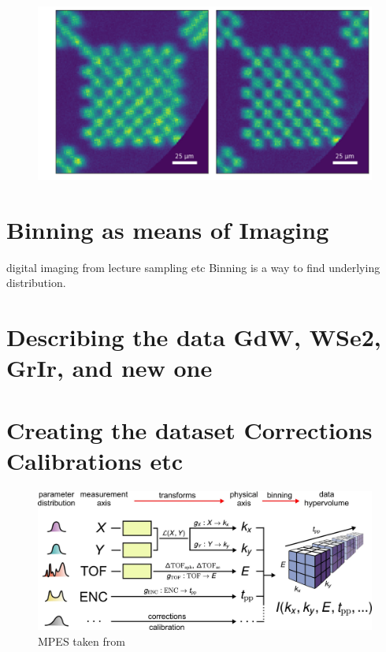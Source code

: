 \begin{figure}
    \includegraphics[width=1\linewidth]{images/chessy_deblurring_merged_events.png}
\end{figure}

\section{Binning as means of Imaging}
digital imaging from lecture
sampling etc
Binning is a way to find underlying distribution.


\section{Describing the data GdW, WSe2, GrIr, and new one}

\section{Creating the dataset Corrections Calibrations etc}
\begin{figure}
    \centering
    \includegraphics[width=1\linewidth]{images/2024-08-25-22-36-44.png}
    \caption{MPES taken from \cite{xianOpensourceEndtoendWorkflow2020}}
\end{figure}